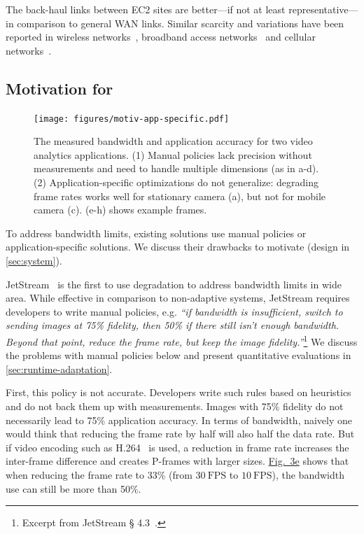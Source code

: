The back-haul links between EC2 sites are better---if not at least
representative---in comparison to general WAN links. Similar scarcity and
variations have been reported in wireless networks~\cite{biswas2015large},
broadband access networks~\cite{grover2013peeking, sundaresan2014bismark} and
cellular networks~\cite{nikravesh2014mobile}.

\subsection{Motivation for \sysname{}}
\label{subsec:motivation}

\begin{figure}
  \centering
  \texttt{[image: figures/motiv-app-specific.pdf]}
  \vspace{-0.8em}
  \caption{The measured bandwidth and application accuracy for two video
    analytics applications. (1) Manual policies lack precision without
    measurements and need to handle multiple dimensions (as in a-d). (2)
    Application-specific optimizations do not generalize: degrading frame rates
    works well for stationary camera (a), but not for mobile camera (c). (e-h)
    shows example frames.}
  \label{fig:app-specific}
\end{figure}

To address bandwidth limits, existing solutions use manual policies or
application-specific solutions. We discuss their drawbacks to motivate
\sysname{} (design in \autoref{sec:system}).

 JetStream~\cite{rabkin2014aggregation} is
the first to use degradation to address bandwidth limits in wide area. While
effective in comparison to non-adaptive systems, JetStream requires developers
to write manual policies, e.g. \textit{``if bandwidth is insufficient, switch to
  sending images at 75\% fidelity, then 50\% if there still isn't enough
  bandwidth. Beyond that point, reduce the frame rate, but keep the image
  fidelity.''}\footnote{Excerpt from JetStream \S
  4.3~\cite{rabkin2014aggregation}.} We discuss the problems with manual
policies below and present quantitative evaluations in
\autoref{sec:runtime-adaptation}.

First, this policy is not accurate.  Developers write such rules based on
heuristics and do not back them up with measurements. Images with 75\% fidelity
do not necessarily lead to 75\% application accuracy. In terms of bandwidth,
naively one would think that reducing the frame rate by half will also half the
data rate. But if video encoding such as H.264~\cite{richardson2011h} is used, a
reduction in frame rate increases the inter-frame difference and creates
P-frames with larger sizes. \hyperref[fig:app-specific]{Fig.~3e} shows that when
reducing the frame rate to 33\% (from \(30~\text{FPS}\) to \(10~\text{FPS}\)),
the bandwidth use can still be more than 50\%.

